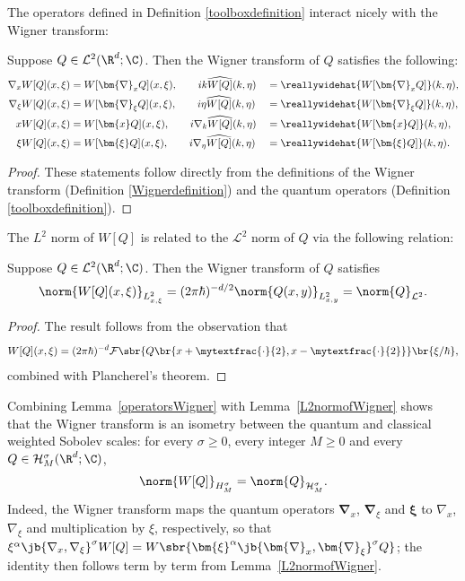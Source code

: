 The operators defined in Definition \ref{toolboxdefinition} interact nicely with the Wigner transform:
\begin{lemma}\label{operatorsWigner}Suppose $Q\in\mathcal L^2(\R^d;\C)$. Then the Wigner transform of $Q$ satisfies the following:\begin{alignat*}{2}
\nabla_xW[Q](x,\xi)&=W[\bm{\nabla}_x Q](x,\xi),\qquad ik\widehat{W[Q]}(k,\eta)&&=\reallywidehat{W[\bm{\nabla}_x Q]}(k,\eta), \\
\nabla_\xi W[Q](x,\xi)&=W[\bm{\nabla}_\xi Q](x,\xi),\qquad i\eta \widehat{W[Q]}(k,\eta)&&=\reallywidehat{W[\bm{\nabla}_\xi Q]}(k,\eta), \\
xW[Q](x,\xi)&=W[\bm{x}Q](x,\xi),\qquad i\nabla_k\widehat{W[Q]}(k,\eta)&&=\reallywidehat{W[\bm{x}Q]}(k,\eta), \\
\xi W[Q](x,\xi)&=W[\bm{\xi}Q](x,\xi),\qquad i\nabla_\eta\widehat{W[Q]}(k,\eta)&&=\reallywidehat{W[\bm{\xi}Q]}(k,\eta).
\end{alignat*}
\end{lemma}
\begin{proof} These statements follow directly from the definitions of the Wigner transform (Definition \ref{Wignerdefinition}) and the quantum operators (Definition \ref{toolboxdefinition}). \end{proof}

The $L^2$ norm of $W[Q]$ is related to the $\mathcal L^2$ norm of $Q$ via the following relation:
\begin{lemma}\label{L2normofWigner}
Suppose $Q\in\mathcal L^2(\R^d;\C)$. Then the Wigner transform of $Q$ satisfies
\begin{align*}
\norm{W[Q](x,\xi)}_{L^2_{x,\xi}}=(2\pi\hbar)^{-d/2}\norm{Q(x,y)}_{L^2_{x,y}}=\norm{Q}_{\mathcal L^2}.
\end{align*}
\end{lemma}
\begin{proof}
The result follows from the observation that
\begin{align*}
W[Q](x,\xi)=(2\pi\hbar)^{-d}\mathcal F\sbr{Q\br{x+\mytextfrac{\cdot}{2},x-\mytextfrac{\cdot}{2}}}\br{\xi/\hbar},
\end{align*}combined with Plancherel's theorem.
\end{proof}

\begin{remark}\label{wignerisometry}
Combining Lemma~\ref{operatorsWigner} with Lemma~\ref{L2normofWigner} shows that the Wigner transform is an isometry between the quantum and classical weighted Sobolev scales: for every $\sigma\geq0$, every integer $M\geq0$ and every $Q\in\mathcal H^{\sigma}_M(\R^d;\C)$,
\begin{align*}
\norm{W[Q]}_{H^{\sigma}_M}=\norm{Q}_{\mathcal H^{\sigma}_M}.
\end{align*}
Indeed, the Wigner transform maps the quantum operators $\bm{\nabla}_x$, $\bm{\nabla}_\xi$ and $\bm{\xi}$ to $\nabla_x$, $\nabla_\xi$ and multiplication by $\xi$, respectively, so that $\xi^\alpha\jb{\nabla_x,\nabla_\xi}^{\sigma}W[Q]=W\sbr{\bm{\xi}^\alpha\jb{\bm{\nabla}_x,\bm{\nabla}_\xi}^{\sigma}Q}$; the identity then follows term by term from Lemma~\ref{L2normofWigner}.
\end{remark}

